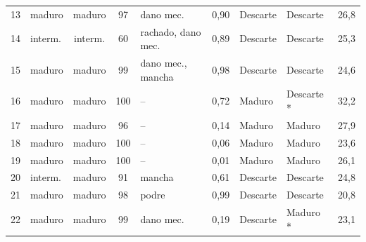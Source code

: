 \begin{table}[htb]
\begin{tabular}{clccp{2.4cm}cllc}
		13 & maduro & maduro & 97 & dano mec. & 0,90 & Descarte & Descarte & 26,8 \\
		14 & interm. & interm. & 60 & rachado, dano mec. & 0,89 & Descarte & Descarte & 25,3 \\
		15 & maduro & maduro & 99 & dano mec., mancha & 0,98 & Descarte & Descarte & 24,6 \\
		16 & maduro & maduro & 100 & -- & 0,72 & Maduro & Descarte * & 32,2 \\
		17 & maduro & maduro & 96 & -- & 0,14 & Maduro & Maduro & 27,9 \\
		18 & maduro & maduro & 100 & -- & 0,06 & Maduro & Maduro & 23,6 \\
		19 & maduro & maduro & 100 & -- & 0,01 & Maduro & Maduro & 26,1 \\
		20 & interm. & maduro & 91 & mancha & 0,61 & Descarte & Descarte & 24,8 \\
		21 & maduro & maduro & 98 & podre & 0,99 & Descarte & Descarte & 20,8 \\
		22 & maduro & maduro & 99 & dano mec. & 0,19 & Descarte & Maduro * & 23,1 \\
		\bottomrule
	\end{tabular}
\end{table}
